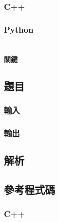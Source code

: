 \documentclass[a4paper,10pt]{article}
\begin{document}
\subsubsection{C++}



\subsubsection{Python}



\section{}

\paragraph{關鍵}

\subsection{題目}



\subsubsection{輸入}



\subsubsection{輸出}



\subsection{解析}



\subsection{參考程式碼}

\subsubsection{C++}

%
\end{document}
